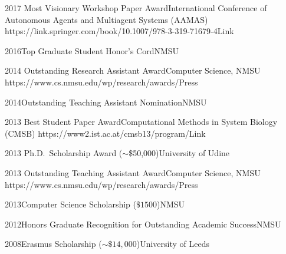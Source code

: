 \begin{awards}
	\awardentry
	{2017}
	{Most Visionary Workshop Paper Award}{International Conference of 
	Autonomous Agents and Multiagent Systems (AAMAS)}
   {https://link.springer.com/book/10.1007/978-3-319-71679-4}{Link}

\awardentryN
{2016}{Top Graduate Student Honor's Cord}{NMSU}

\awardentry
	{2014}
	{Outstanding Research Assistant Award}{Computer Science, NMSU}
	{https://www.cs.nmsu.edu/wp/research/awards/}{Press}

\awardentryN
	{2014}{Outstanding Teaching Assistant Nomination}{NMSU}

	\awardentry
	{2013}
	{Best Student Paper Award}{Computational Methods in System Biology (CMSB)}
	{https://www2.ist.ac.at/cmsb13/program/}{Link}

\awardentryN
	{2013}
	{Ph.D.~Scholarship Award ($\sim$\$50,000)}{University of Udine}

\awardentry 
   {2013}
   {Outstanding Teaching Assistant Award}{Computer Science, NMSU}
   {https://www.cs.nmsu.edu/wp/research/awards/}{Press}

\awardentryN
{2013}{Computer Science Scholarship ($\$ 1500$)}{NMSU}

\awardentryN
{2012}{Honors Graduate Recognition for Outstanding Academic Success}{NMSU}

\awardentryN
{2008}{Erasmus Scholarship ($\sim \$ 14,000$)}{University of Leeds}

\end{awards}

